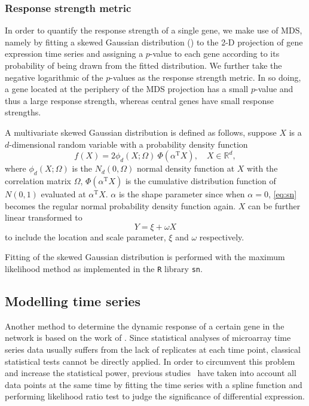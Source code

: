 \subsubsection{Response strength metric}
\label{sec:response_strength}
In order to quantify the response strength of a single gene, we make use of 
MDS, namely by fitting a skewed Gaussian distribution (\citealp{Azzalini2003}) 
to the 2-D projection
of gene expression time series and assigning a $p$-value to each
gene according to its probability of being drawn from the fitted distribution.
We further take the negative logarithmic of the $p$-values as the response
strength metric. In so doing, a gene located at the periphery of the MDS
projection has a small $p$-value and thus a large response strength, whereas
central genes have small response strengths.

A multivariate skewed Gaussian distribution is defined as follows, suppose
$X$ is a $d$-dimensional random variable with a probability density function
\begin{equation}
f(X) = 2 \phi_d (X;\Omega) \ \Phi(\alpha^{\mathrm{T}} X), \quad X \in \mathbb{R}^d,
\label{eq:sn}
\end{equation}
where $\phi_d(X;\Omega)$ is the $N_d(0,\Omega)$ normal density function at $X$
with the correlation matrix $\Omega$, $\Phi(\alpha^{\mathrm{T}} X)$ is the 
cumulative distribution function of $N(0,1)$ evaluated at $\alpha^{\mathrm{T}} X$.
$\alpha$ is the shape parameter since when $\alpha=0$, \ref{eq:sn} becomes
the regular normal probability density function again. $X$ can be further
linear transformed to
\[
Y = \xi + \omega X
\]
to include the location and scale parameter, $\xi$ and $\omega$ respectively.

Fitting of the skewed Gaussian distribution is performed with
the maximum likelihood method as implemented in the 
\texttt{R}
library \texttt{sn}.

\subsection{Modelling time series}
Another method to determine the dynamic response of a certain
gene in the network is based on the work of \cite{Mar2009}. 
Since statistical analyses of microarray time series data usually 
suffers from the lack
of replicates at each time point, classical statistical tests 
cannot be directly applied. In order to 
circumvent this problem and increase the statistical power,
previous studies~\citep{Bar-Joseph2003,Storey2005} have taken into 
account all data points at the
same time by fitting the time series with a spline function and 
performing likelihood ratio test to judge the significance of 
differential expression.

